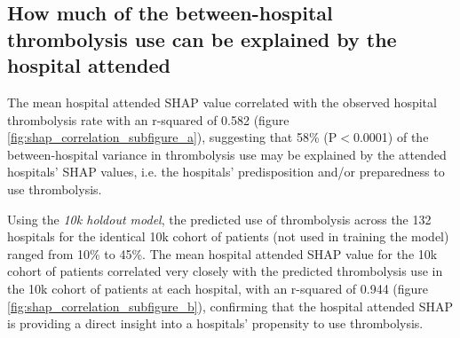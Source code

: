 \subsection{How much of the between-hospital thrombolysis use can be explained by the hospital attended}

The mean hospital attended SHAP value correlated with the observed hospital thrombolysis rate with an r-squared of 0.582 (figure \ref{fig:shap_correlation_subfigure_a}), suggesting that 58\% (P$<$0.0001) of the between-hospital variance in thrombolysis use may be explained by the attended hospitals' SHAP values, i.e. the hospitals' predisposition and/or preparedness to use thrombolysis. %

Using the \emph{10k holdout model}, the predicted use of thrombolysis across the 132 hospitals for the identical 10k cohort of patients (not used in training the model) ranged from 10\% to 45\%. The mean hospital attended SHAP value for the 10k cohort of patients correlated very closely with the predicted thrombolysis use in the 10k cohort of patients at each hospital, with an r-squared of 0.944 (figure \ref{fig:shap_correlation_subfigure_b}), confirming that the hospital attended SHAP is providing a direct insight into a hospitals' propensity to use thrombolysis.

